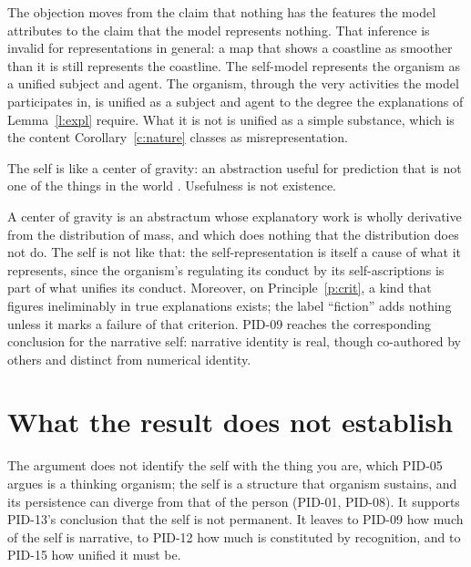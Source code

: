 \documentclass{situationist-preprint}
\begin{document}
\begin{reply}
The objection moves from the claim that nothing has the features the model attributes to the claim that the model represents nothing. That inference is invalid for representations in general: a map that shows a coastline as smoother than it is still represents the coastline. The self-model represents the organism as a unified subject and agent. The organism, through the very activities the model participates in, is unified as a subject and agent to the degree the explanations of Lemma~\ref{l:expl} require. What it is not is unified as a simple substance, which is the content Corollary~\ref{c:nature} classes as misrepresentation.
\end{reply}

\begin{objection}
The self is like a center of gravity: an abstraction useful for prediction that is not one of the things in the world \citep{Dennett1992}. Usefulness is not existence.
\end{objection}

\begin{reply}
A center of gravity is an abstractum whose explanatory work is wholly derivative from the distribution of mass, and which does nothing that the distribution does not do. The self is not like that: the self-representation is itself a cause of what it represents, since the organism's regulating its conduct by its self-ascriptions is part of what unifies its conduct. Moreover, on Principle~\ref{p:crit}, a kind that figures ineliminably in true explanations exists; the label \enquote{fiction} adds nothing unless it marks a failure of that criterion. PID-09 reaches the corresponding conclusion for the narrative self: narrative identity is real, though co-authored by others and distinct from numerical identity.
\end{reply}

\section{What the result does not establish}\label{s:not}

The argument does not identify the self with the thing you are, which PID-05 argues is a thinking organism; the self is a structure that organism sustains, and its persistence can diverge from that of the person (PID-01, PID-08). It supports PID-13's conclusion that the self is not permanent. It leaves to PID-09 how much of the self is narrative, to PID-12 how much is constituted by recognition, and to PID-15 how unified it must be.
\end{document}
